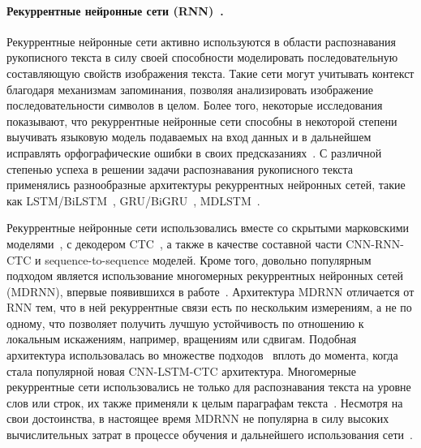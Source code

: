 \paragraph{Рекуррентные нейронные сети (RNN)~\cite{medsker2001recurrent}.}{
    Рекуррентные нейронные сети активно используются в области распознавания рукописного текста в силу своей способности
    моделировать последовательную составляющую свойств изображения текста.
    Такие сети могут учитывать контекст благодаря механизмам запоминания, позволяя анализировать изображение последовательности символов в целом.
    Более того, некоторые исследования показывают, что рекуррентные нейронные сети способны в некоторой степени выучивать
    языковую модель подаваемых на вход данных и в дальнейшем исправлять орфографические ошибки в своих предсказаниях~\cite{sabir2017implicit}.
    С различной степенью успеха в решении задачи распознавания рукописного текста применялись разнообразные архитектуры рекуррентных нейронных сетей,
    такие как LSTM/BiLSTM~\cite{hochreiter1997long}, GRU/BiGRU~\cite{cho2014properties}, MDLSTM~\cite{graves2007multi}.

    Рекуррентные нейронные сети использовались вместе со скрытыми марковскими моделями~\cite{bluche2014comparison},
    с декодером CTC~\cite{graves2008novel}, а также в качестве составной части CNN-RNN-CTC и sequence-to-sequence моделей.
    Кроме того, довольно популярным подходом является использование многомерных рекуррентных нейронных сетей (MDRNN),
    впервые появившихся в работе~\cite{graves2008offline}.
    Архитектура MDRNN отличается от RNN тем, что в ней рекуррентные связи есть по нескольким измерениям, а не по одному,
    что позволяет получить лучшую устойчивость по отношению к локальным искажениям, например, вращениям или сдвигам.
    Подобная архитектура использовалась во множестве подходов~\cite{pham2014dropout,strausscitlab,voigtlaender2016handwriting}
    вплоть до момента, когда стала популярной новая CNN-LSTM-CTC архитектура.
    Многомерные рекуррентные сети использовались не только для распознавания текста на уровне слов или строк,
    их также применяли к целым параграфам текста~\cite{bluche2017scan}.
    Несмотря на свои достоинства, в настоящее время MDRNN не популярна в силу высоких вычислительных затрат
    в процессе обучения и дальнейшего использования сети~\cite{puigcerver2017multidimensional}.
}

